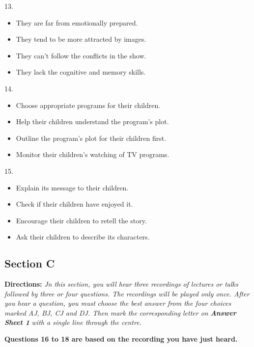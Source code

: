 \documentclass[UTF8,11pt]{ctexart}
\begin{document}
13.


\begin{itemize}[leftmargin=2em,itemsep=.2em,topsep=.4em]\item[A.] They are far from emotionally prepared.
\item[B.] They tend to be more attracted by images.
\item[C.] They can't follow the conflicts in the show.
\item[D.] They lack the cognitive and memory skills.
\end{itemize}

14.


\begin{itemize}[leftmargin=2em,itemsep=.2em,topsep=.4em]\item[A.] Choose appropriate programs for their children.
\item[B.] Help their children understand the program's plot.
\item[C.] Outline the program's plot for their children first.
\item[D.] Monitor their children's watching of TV programs.
\end{itemize}

15.


\begin{itemize}[leftmargin=2em,itemsep=.2em,topsep=.4em]\item[A.] Explain its message to their children.
\item[B.] Check if their children have enjoyed it.
\item[C.] Encourage their children to retell the story.
\item[D.] Ask their children to describe its characters.
\end{itemize}

\subsection*{\textbf{Section C}}


\textbf{Directions: }\textit{Jn this section, you will hear three recordings of lectures or talks followed by three} \textit{or four questions. The recordings will be played only once. After you hear a question, you must} \textit{choose the best answer from the four choices marked AJ, BJ, CJ and DJ. Then mark the} \textit{corresponding letter on }\textbf{\textit{Answer Sheet 1 }}\textit{with a single line through the centre.}


\textbf{Questions 16 to 18 are based on the recording you have just heard.}
\end{document}
